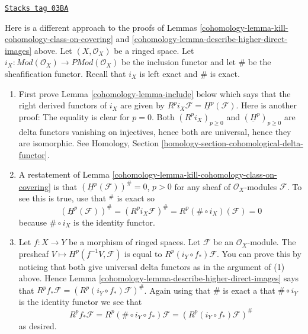 \begin{remark}[Daniel]
\label{cohomology-remark-daniel}
\href{https://stacks.math.columbia.edu/tag/03BA}{\texttt{Stacks tag 03BA}}

Here is a different approach to the proofs of
Lemmas \ref{cohomology-lemma-kill-cohomology-class-on-covering} and
\ref{cohomology-lemma-describe-higher-direct-images} above.
Let $(X, \mathcal{O}_X)$ be a ringed space.
Let $i_X : \textit{Mod}(\mathcal{O}_X) \to \textit{PMod}(\mathcal{O}_X)$
be the inclusion functor and let $\#$ be the sheafification functor.
Recall that $i_X$ is left exact and $\#$ is exact.
\begin{enumerate}
\item First prove Lemma \ref{cohomology-lemma-include} below which says that the
right derived functors of $i_X$ are given by
$R^pi_X\mathcal{F} = \underline{H}^p(\mathcal{F})$.
Here is another proof: The equality is clear for $p = 0$.
Both $(R^pi_X)_{p \geq 0}$ and $(\underline{H}^p)_{p \geq 0}$
are delta functors vanishing on injectives, hence both are universal,
hence they are isomorphic. See Homology,
Section \ref{homology-section-cohomological-delta-functor}.
\item A restatement of Lemma \ref{cohomology-lemma-kill-cohomology-class-on-covering}
is that $(\underline{H}^p(\mathcal{F}))^\# = 0$, $p > 0$ for any sheaf of
$\mathcal{O}_X$-modules $\mathcal{F}$.
To see this is true, use that ${}^\#$ is exact so
$$
(\underline{H}^p(\mathcal{F}))^\# =
(R^pi_X\mathcal{F})^\# =
R^p(\# \circ i_X)(\mathcal{F}) = 0
$$
because $\# \circ i_X$ is the identity functor.
\item Let $f : X \to Y$ be a morphism of ringed spaces.
Let $\mathcal{F}$ be an $\mathcal{O}_X$-module. The presheaf
$V \mapsto H^p(f^{-1}V, \mathcal{F})$ is equal to
$R^p (i_Y \circ f_*)\mathcal{F}$. You can prove this by noticing that
both give universal delta functors as in the argument of (1) above.
Hence Lemma \ref{cohomology-lemma-describe-higher-direct-images}
says that $R^p f_* \mathcal{F}= (R^p (i_Y \circ f_*)\mathcal{F})^\#$.
Again using that $\#$ is exact a that $\# \circ i_Y$ is the identity
functor we see that
$$
R^p f_* \mathcal{F} =
R^p(\# \circ i_Y \circ f_*)\mathcal{F} =
(R^p (i_Y \circ f_*)\mathcal{F})^\#
$$
as desired.
\end{enumerate}
\end{remark}

